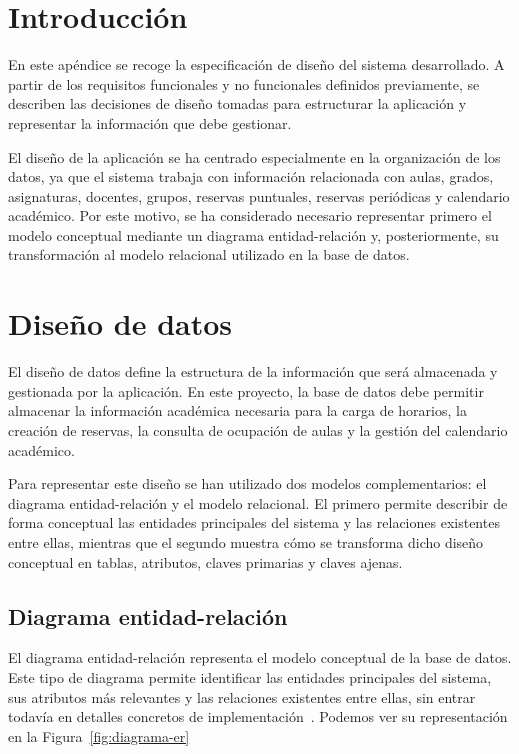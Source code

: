 
\section{Introducción}

En este apéndice se recoge la especificación de diseño del sistema desarrollado. A partir de los requisitos funcionales y no funcionales definidos previamente, se describen las decisiones de diseño tomadas para estructurar la aplicación y representar la información que debe gestionar.

El diseño de la aplicación se ha centrado especialmente en la organización de los datos, ya que el sistema trabaja con información relacionada con aulas, grados, asignaturas, docentes, grupos, reservas puntuales, reservas periódicas y calendario académico. Por este motivo, se ha considerado necesario representar primero el modelo conceptual mediante un diagrama entidad-relación y, posteriormente, su transformación al modelo relacional utilizado en la base de datos.

\section{Diseño de datos}

El diseño de datos define la estructura de la información que será almacenada y gestionada por la aplicación. En este proyecto, la base de datos debe permitir almacenar la información académica necesaria para la carga de horarios, la creación de reservas, la consulta de ocupación de aulas y la gestión del calendario académico.

Para representar este diseño se han utilizado dos modelos complementarios: el diagrama entidad-relación y el modelo relacional. El primero permite describir de forma conceptual las entidades principales del sistema y las relaciones existentes entre ellas, mientras que el segundo muestra cómo se transforma dicho diseño conceptual en tablas, atributos, claves primarias y claves ajenas.

\subsection{Diagrama entidad-relación}

El diagrama entidad-relación representa el modelo conceptual de la base de datos. Este tipo de diagrama permite identificar las entidades principales del sistema, sus atributos más relevantes y las relaciones existentes entre ellas, sin entrar todavía en detalles concretos de implementación~\cite{diagrama_er}. Podemos ver su representación en la Figura~\ref{fig:diagrama-er}

